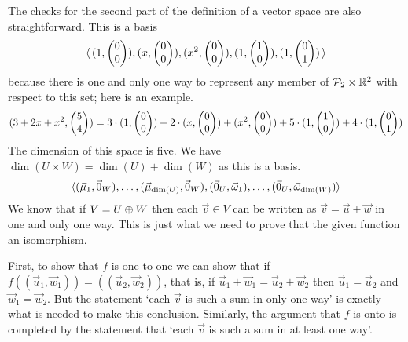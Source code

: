 \begin{exercises}
\begin{answer}
\begin{exparts}
          The checks for the second part of the definition of a vector space
          are also straightforward.
        \partsitem This is a basis
          \begin{equation*}
            \langle\, (1,\begin{pmatrix} 0 \\ 0 \end{pmatrix}), (x,\begin{pmatrix} 0 \\ 0 \end{pmatrix}),
              (x^2,\begin{pmatrix} 0 \\ 0 \end{pmatrix}), (1,\begin{pmatrix} 1 \\ 0 \end{pmatrix}),
              (1,\begin{pmatrix} 0 \\ 1 \end{pmatrix}) \,\rangle
          \end{equation*}
          because there is one and only one way to represent any
          member of $\mathcal{P}_2\times \mathbb{R}^2$ with respect to this set; 
          here is an example.
          \begin{equation*}
            (3+2x+x^2,\begin{pmatrix} 5 \\ 4 \end{pmatrix})
             =  
              3\cdot(1,\begin{pmatrix} 0 \\ 0 \end{pmatrix})
              +2\cdot(x,\begin{pmatrix} 0 \\ 0 \end{pmatrix})
              +(x^2,\begin{pmatrix} 0 \\ 0 \end{pmatrix}) 
              +5\cdot(1,\begin{pmatrix} 1 \\ 0 \end{pmatrix})
              +4\cdot(1,\begin{pmatrix} 0 \\ 1 \end{pmatrix}) 
          \end{equation*}
          The dimension of this space is five.
        \partsitem We have \( \dim(U\times W)=\dim(U)+\dim(W) \) 
          as this is a basis.
          \begin{equation*}
            \langle (\vec{\mu}_1,\vec{0}_W), \dots,
              (\vec{\mu}_{\dim(U)},\vec{0}_W), (\vec{0}_U,\vec{\omega}_1),
              \ldots,(\vec{0}_U,\vec{\omega}_{\dim(W)}) \rangle
          \end{equation*}
        \partsitem We know that if \( V=U\oplus W \) then each 
          \( \vec{v}\in V \)
          can be written as \( \vec{v}=\vec{u}+\vec{w} \) in one and only one
          way.
          This is just what we need to prove that 
          the given function an isomorphism.

          First, to show that \( f \) is one-to-one we can show that if
          \( f\left((\vec{u}_1,\vec{w}_1)\right)
                 =\left((\vec{u}_2,\vec{w}_2)\right) \), that is, if 
          \( \vec{u}_1+\vec{w}_1=\vec{u}_2+\vec{w}_2 \) then
          \( \vec{u}_1=\vec{u}_2 \) and \( \vec{w}_1=\vec{w}_2 \).
          But the statement 
          `each $\vec{v}$ is such a sum in only one way' is exactly what is
          needed to make this conclusion.
          Similarly, the argument that \( f \) is onto is completed by the
          statement that 
          `each $\vec{v}$ is such a sum in at least one way'.


\end{exparts}
\end{answer}
\end{exercises}
